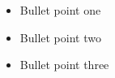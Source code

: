 %

\begin{frame}[plain]

  \vspace{14mm}
  \begin{minipage}[t][68mm][t]{\textwidth}
    \raggedright
    \begin{itemize}
      \tightlist
      \item Bullet point one
      \item Bullet point two
      \item Bullet point three
    \end{itemize}
  \end{minipage}

  \slideheaderfooter
\end{frame}

